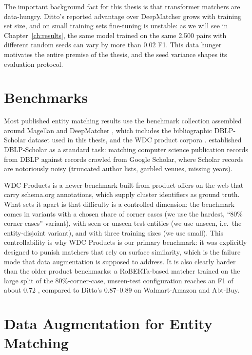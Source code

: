 \documentclass[a4paper,oneside,bibliography=totoc]{scrbook}
\begin{document}
The important background fact for this thesis is that transformer matchers are data-hungry. Ditto's reported advantage over DeepMatcher grows with training set size, and on small training sets fine-tuning is unstable: as we will see in Chapter~\ref{ch:results}, the same model trained on the same 2{,}500 pairs with different random seeds can vary by more than 0.02 F1. This data hunger motivates the entire premise of the thesis, and the seed variance shapes its evaluation protocol.

\section{Benchmarks}
\label{sec:rw_benchmarks}

Most published entity matching results use the benchmark collection assembled around Magellan and DeepMatcher \cite{konda2016magellan,mudgal2018deep}, which includes the bibliographic DBLP-Scholar dataset used in this thesis, and the WDC product corpora \cite{primpeli2019wdc}. \citet{kopcke2010evaluation} established DBLP-Scholar as a standard task: matching computer science publication records from DBLP against records crawled from Google Scholar, where Scholar records are notoriously noisy (truncated author lists, garbled venues, missing years).

WDC Products \cite{peeters2024wdc} is a newer benchmark built from product offers on the web that carry schema.org annotations, which supply cluster identifiers as ground truth. What sets it apart is that difficulty is a controlled dimension: the benchmark comes in variants with a chosen share of corner cases (we use the hardest, ``80\% corner cases'' variant), with seen or unseen test entities (we use unseen, i.e.\ the entity-disjoint variant), and with three training sizes (we use small). This controllability is why WDC Products is our primary benchmark: it was explicitly designed to punish matchers that rely on surface similarity, which is the failure mode that data augmentation is supposed to address. It is also clearly harder than the older product benchmarks: a RoBERTa-based matcher trained on the large split of the 80\%-corner-case, unseen-test configuration reaches an F1 of about 0.72 \cite{peeters2024wdc,steiner2026labeling}, compared to Ditto's 0.87--0.89 on Walmart-Amazon and Abt-Buy.

\section{Data Augmentation for Entity Matching}
\label{sec:rw_augmentation}
\end{document}
